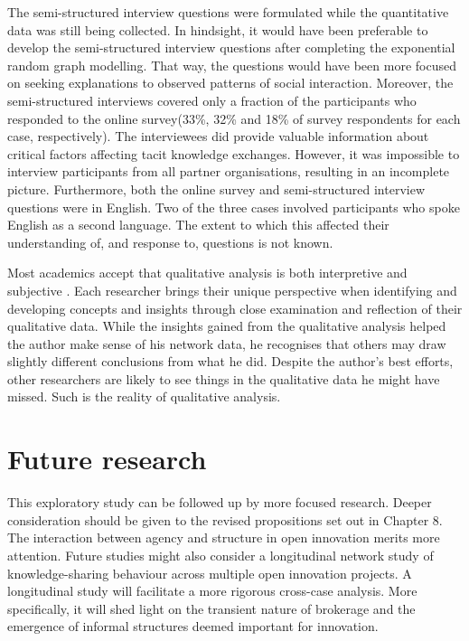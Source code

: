 The semi-structured interview questions were formulated while the quantitative data was still being collected. In hindsight, it would have been preferable to develop the semi-structured interview questions after completing the exponential random graph modelling. That way, the questions would have been more focused on seeking explanations to observed patterns of social interaction. Moreover, the semi-structured interviews covered only a fraction of the participants who responded to the online survey(33\%, 32\% and 18\% of survey respondents for each case, respectively). The interviewees did provide valuable information about critical factors affecting tacit knowledge exchanges. However, it was impossible to interview participants from all partner organisations, resulting in an incomplete picture. Furthermore, both the online survey and semi-structured interview questions were in English. Two of the three cases involved participants who spoke English as a second language. The extent to which this affected their understanding of, and response to, questions is not known. \medskip

Most academics accept that qualitative analysis is both interpretive and subjective \citep{aspers2019qualitative}. Each researcher brings their unique perspective when identifying and developing concepts and insights through close examination and reflection of their qualitative data. While the insights gained from the qualitative analysis helped the author make sense of his network data, he recognises that others may draw slightly different conclusions from what he did. Despite the author's best efforts, other researchers are likely to see things in the qualitative data he might have missed. Such is the reality of qualitative analysis. \medskip

\section{Future research}

This exploratory study can be followed up by more focused research. Deeper consideration should be given to the revised propositions set out in Chapter 8. The interaction between agency and structure in open innovation merits more attention. Future studies might also consider a longitudinal network study of knowledge-sharing behaviour across multiple open innovation projects. A longitudinal study will facilitate a more rigorous cross-case analysis. More specifically, it will shed light on the transient nature of brokerage and the emergence of informal structures deemed important for innovation. \medskip

